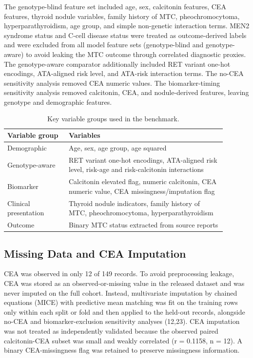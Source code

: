 \documentclass[12pt]{article}
\begin{document}
The genotype-blind feature set included age, sex, calcitonin features, CEA features, thyroid nodule variables, family history of MTC, pheochromocytoma, hyperparathyroidism, age group, and simple non-genetic interaction terms. MEN2 syndrome status and C-cell disease status were treated as outcome-derived labels and were excluded from all model feature sets (genotype-blind and genotype-aware) to avoid leaking the MTC outcome through correlated diagnostic proxies. The genotype-aware comparator additionally included RET variant one-hot encodings, ATA-aligned risk level, and ATA-risk interaction terms. The no-CEA sensitivity analysis removed CEA numeric values. The biomarker-timing sensitivity analysis removed calcitonin, CEA, and nodule-derived features, leaving genotype and demographic features.

\begin{table}[ht]
\centering
\caption{Key variable groups used in the benchmark.}
\begin{tabular}{@{}p{0.25\linewidth}p{0.64\linewidth}@{}}
\toprule
Variable group & Variables \\
\midrule
Demographic & Age, sex, age group, age squared \\
Genotype-aware & RET variant one-hot encodings, ATA-aligned risk level, risk-age and risk-calcitonin interactions \\
Biomarker & Calcitonin elevated flag, numeric calcitonin, CEA numeric value, CEA missingness/imputation flag \\
Clinical presentation & Thyroid nodule indicators, family history of MTC, pheochromocytoma, hyperparathyroidism \\
Outcome & Binary MTC status extracted from source reports \\
\bottomrule
\end{tabular}
\end{table}

\subsection{Missing Data and CEA Imputation}
CEA was observed in only 12 of 149 records. To avoid preprocessing leakage, CEA was stored as an observed-or-missing value in the released dataset and was never imputed on the full cohort. Instead, multivariate imputation by chained equations (MICE) with predictive mean matching was fit on the training rows only within each split or fold and then applied to the held-out records, alongside no-CEA and biomarker-exclusion sensitivity analyses (12,23). CEA imputation was not treated as independently validated because the observed paired calcitonin-CEA subset was small and weakly correlated (r = 0.1158, n = 12). A binary CEA-missingness flag was retained to preserve missingness information.
\end{document}
